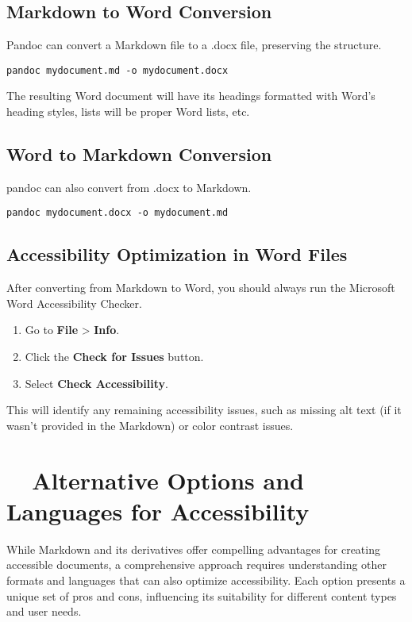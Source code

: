 \subsection{Markdown to Word Conversion}
\label{subsec:markdown-to-word}
Pandoc can convert a Markdown file to a .docx file, preserving the structure.
\begin{verbatim}
pandoc mydocument.md -o mydocument.docx
\end{verbatim}
The resulting Word document will have its headings formatted with Word's heading styles, lists will be proper Word lists, etc.

\subsection{Word to Markdown Conversion}
\label{subsec:word-to-markdown}
pandoc can also convert from .docx to Markdown.
\begin{verbatim}
pandoc mydocument.docx -o mydocument.md
\end{verbatim}

\subsection{Accessibility Optimization in Word Files}
\label{subsec:word-accessibility-optimization}
After converting from Markdown to Word, you should always run the Microsoft Word Accessibility Checker.
\begin{enumerate}
	\item Go to \textbf{File} > \textbf{Info}.
	\item Click the \textbf{Check for Issues} button.
	\item Select \textbf{Check Accessibility}.
\end{enumerate}
This will identify any remaining accessibility issues, such as missing alt text (if it wasn't provided in the Markdown) or color contrast issues.

\section{~~Alternative Options and Languages for Accessibility}
\label{sec:alt-options-accessibility}

While Markdown and its derivatives offer compelling advantages for creating accessible documents, a comprehensive approach requires understanding other formats and languages that can also optimize accessibility. Each option presents a unique set of pros and cons, influencing its suitability for different content types and user needs.

